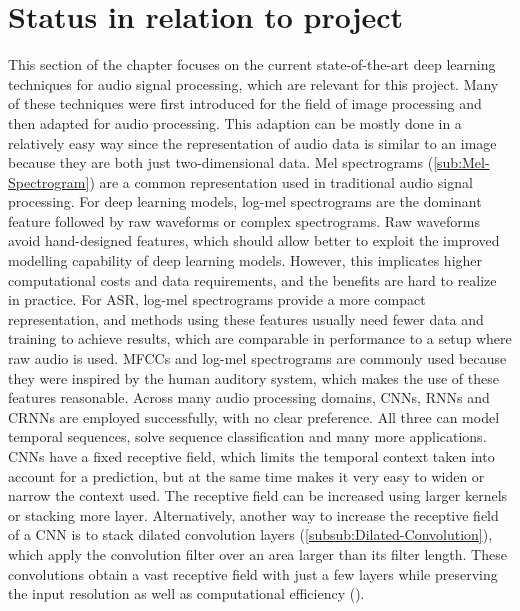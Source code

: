 \section{Status in relation to project}
\label{sec:Status-Relation-Project}
This section of the chapter focuses on the current state-of-the-art deep learning techniques for audio signal processing, which are relevant for this project. Many of these techniques were first introduced for the field of image processing and then adapted for audio processing. This adaption can be mostly done in a relatively easy way since the representation of audio data is similar to an image because they are both just two-dimensional data.
\newline
\newline
Mel spectrograms (\ref{sub:Mel-Spectrogram}) are a common representation used in traditional audio signal processing. For deep learning models, log-mel spectrograms are the dominant feature followed by raw waveforms or complex spectrograms. Raw waveforms avoid hand-designed features, which should allow better to exploit the improved modelling capability of deep learning models. However, this implicates higher computational costs and data requirements, and the benefits are hard to realize in practice. For \gls{ASR}, log-mel spectrograms provide a more compact representation, and methods using these features usually need fewer data and training to achieve results, which are comparable in performance to a setup where raw audio is used. \glspl{MFCC} and log-mel spectrograms are commonly used because they were inspired by the human auditory system, which makes the use of these features reasonable.
\newline
\newline
Across many audio processing domains, \glspl{CNN}, \glspl{RNN} and \glspl{CRNN} are employed successfully, with no clear preference. All three can model temporal sequences, solve sequence classification and many more applications. \glspl{CNN} have a fixed receptive field, which limits the temporal context taken into account for a prediction, but at the same time makes it very easy to widen or narrow the context used. The receptive field can be increased using larger kernels or stacking more layer. Alternatively, another way to increase the receptive field of a \gls{CNN} is to stack dilated convolution layers (\ref{subsub:Dilated-Convolution}), which apply the convolution filter over an area larger than its filter length. These convolutions obtain a vast receptive field with just a few layers while preserving the input resolution as well as computational efficiency (\cite{franceschi_unsupervised_2020}).
